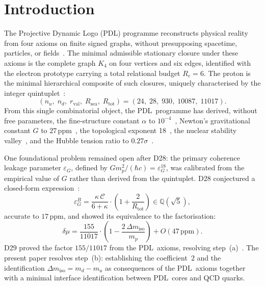 \documentclass[11pt,a4paper]{article}
\theoremstyle{definition}
\newcommand{\PDL}{\textnormal{PDL}}
\newcommand{\Rsea}{R_{\mathrm{sea}}}
\newcommand{\Rtot}{R_{\mathrm{tot}}}
\newcommand{\rval}{r_{\mathrm{val}}}
\newcommand{\epsg}{\varepsilon_G}
\newcommand{\epsgB}{\varepsilon_G^B}
\newcommand{\Kfour}{K_4}
\newcommand{\dmu}{\delta\mu}
\newcommand{\dmiso}{\Delta m_{\mathrm{iso}}}
\newcommand{\Ree}{R_e}
\newcommand{\kap}{\kappa}
\newcommand{\calC}{\mathcal{C}}
\begin{document}
\section{Introduction}
\label{sec:intro}

The Projective Dynamic Logo (\PDL) programme reconstructs physical reality from four axioms on finite signed graphs, without presupposing spacetime, particles, or fields~\cite{PDL_Main_2026,PDL_Intro_2026}. The minimal admissible stationary closure under these axioms is the complete graph $\Kfour$ on four vertices and six edges, identified with the electron prototype carrying a total relational budget $\Ree = 6$. The proton is the minimal hierarchical composite of such closures, uniquely characterised by the integer quintuplet~\cite{Combinatorial_Proton_v2_2026}:
\begin{equation}
(n_u,\;n_d,\;\rval,\;\Rsea,\;\Rtot) = (24,\;28,\;930,\;10087,\;11017).
\label{eq:quintuplet}
\end{equation}
From this single combinatorial object, the \PDL\ programme has derived, without free parameters, the fine-structure constant $\alpha$ to $10^{-4}$~\cite{Alpha_PDL_v2_2026}, Newton's gravitational constant $G$ to $27\,\mathrm{ppm}$~\cite{Bridge_PDL_2026}, the topological exponent 18~\cite{Topology_18_PDL_2026}, the nuclear stability valley~\cite{Nuclear_Stability_PDL_2026}, and the Hubble tension ratio to $0.27\sigma$~\cite{NCMB_PDL_2026}.

One foundational problem remained open after D28: the primary coherence leakage parameter $\epsg$, defined by $Gm_p^2/(\hbar c) = \epsg^{18}$, was calibrated from the empirical value of $G$ rather than derived from the quintuplet. D28 conjectured a closed-form expression~\cite{PDL_D28_2026}:
\begin{equation}
\epsgB = \frac{\kap\,\calC}{6+\kap}\cdot\left(1+\frac{2}{\Rtot}\right) \in \mathbb{Q}(\sqrt{5}),
\label{eq:conj_epsG}
\end{equation}
accurate to $17\,\mathrm{ppm}$, and showed its equivalence to the factorisation:
\begin{equation}
\dmu = \frac{155}{11017}\cdot\left(1 - \frac{2\,\dmiso}{m_p}\right) + O(47\,\mathrm{ppm}).
\label{eq:dmu_factored}
\end{equation}
D29 proved the factor $155/11017$ from the \PDL\ axioms, resolving step~(a)~\cite{PDL_D29_2026}. The present paper resolves step~(b): establishing the coefficient~$2$ and the identification $\dmiso = m_d - m_u$ as consequences of the \PDL\ axioms together with a minimal interface identification between \PDL\ cores and QCD quarks.
\end{document}
